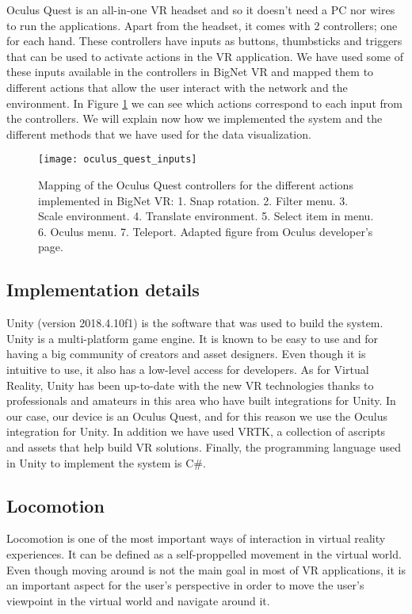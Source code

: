 Oculus Quest is an all-in-one VR headset and so it doesn't need a PC nor wires to run the applications. Apart from the headset, it comes with 2 controllers; one for each hand. These controllers have inputs as buttons, thumbsticks and triggers that can be used to activate actions in the VR application. We have used some of these inputs available in the controllers in BigNet VR and mapped them to different actions that allow the user interact with the network and the environment. In Figure \ref{fig:oculus_quest_inputs} we can see which actions correspond to each input from the controllers. We will explain now how we implemented the system and the different methods that we have used for the data visualization.

\begin{figure}[h!]
    \centering%
    \texttt{[image: oculus\_quest\_inputs]}
    \caption{Mapping of the Oculus Quest controllers for the different actions implemented in BigNet VR: 1. Snap rotation. 2. Filter menu. 3. Scale environment. 4. Translate environment. 5. Select item in menu. 6. Oculus menu. 7. Teleport. Adapted figure from Oculus developer's page\cite{oculus_inputs}.}
    \label{fig:oculus_quest_inputs}
\end{figure}%

\subsection{Implementation details}
Unity (version 2018.4.10f1\cite{unity2018}) is the software that was used to build the system. Unity is a multi-platform game engine. It is known to be easy to use and for having a big community of creators and asset designers\cite{developing_vr_unity}. Even though it is intuitive to use, it also has a low-level access for developers. As for Virtual Reality, Unity has been up-to-date with the new VR technologies thanks to professionals and amateurs in this area who have built integrations for Unity. In our case, our device is an Oculus Quest, and for this reason we use the Oculus integration for Unity\cite{oculus_unity_integration}. In addition we have used VRTK, a collection of ascripts and assets that help build VR solutions\cite{vrtk-what}. Finally, the programming language used in Unity to implement the system is C\#.

\subsection{Locomotion}
Locomotion is one of the most important ways of interaction in virtual reality experiences. It can be defined as a self-proppelled movement in the virtual world. Even though moving around is not the main goal in most of VR applications, it is an important aspect for the user's perspective in order to move the user's viewpoint in the virtual world and navigate around it.

